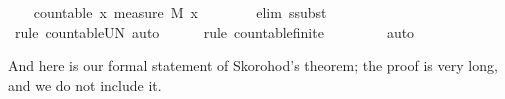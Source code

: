 \documentclass[leqno]{article}
\theoremstyle{definition}
\begin{document}
\begin{isabellebody}
\ \ \isamarkupfalse%
\ {\isachardoublequoteopen}countable\ {\isacharbraceleft}x{\isachardot}\ measure\ M\ {\isacharbraceleft}x{\isacharbraceright}\ {\isachargreater}\ {}{\isacharbraceright}{\isachardoublequoteclose}\isanewline
\ \ \ \ \isamarkupfalse%
\ {\isacharparenleft}elim\ ssubst{\isacharparenright}\isanewline
\ \ \ \ \isamarkupfalse%
\ {\isacharparenleft}rule\ countable{\isacharunderscore}UN{\isacharcomma}\ auto{\isacharparenright}\isanewline
\ \ \ \ \isamarkupfalse%
\ {\isacharparenleft}rule\ countable{\isacharunderscore}finite{\isacharparenright}\isanewline
\ \ \ \ \isamarkupfalse%
\ {\isacharasterisk}{\isacharasterisk}\ \isamarkupfalse%
\ auto\isanewline
{}\isamarkupfalse%
\end{isabellebody}

\medskip

And here is our formal statement of Skorohod's theorem; the proof is very long, and we do not include it.

\medskip
\end{document}
